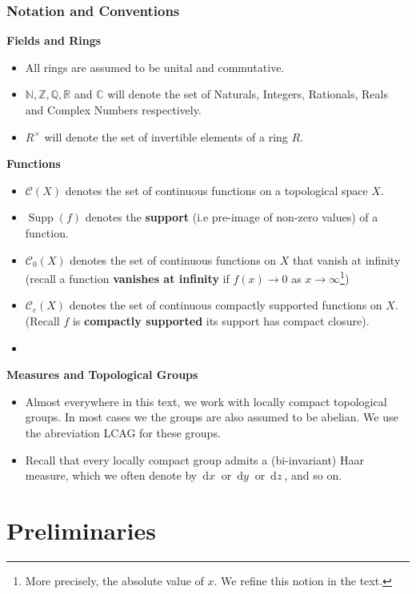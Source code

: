 \documentclass[11pt, x11names]{book}
\newcommand{\nn}{\mathbb{N}}
\newcommand{\zz}{\mathbb{Z}}
\newcommand{\qq}{\mathbb{Q}}
\newcommand{\rr}{\mathbb{R}}
\newcommand{\cc}{\mathbb{C}}
\newcommand{\fanc}{\mathscr{C}}
\DeclareMathOperator{\supp}{Supp}
\newcommand{\dx}{\, \mathrm{d}x \ }
\newcommand{\dy}{\, \mathrm{d}y \ }
\newcommand{\dz}{\, \mathrm{d}z \ }
\begin{document}
\newpage
\subsection*{Notation and Conventions}

\textbf{Fields and Rings}
\begin{itemize}
    \item All rings are assumed to be unital and commutative.
    \item $\nn, \zz, \qq, \rr$ and $\cc$ will denote the set of Naturals, Integers, Rationals, Reals and Complex Numbers respectively.
    \item $R^\times$ will denote the set of invertible elements of a ring $R$.
\end{itemize}

\textbf{Functions}
\begin{itemize}
    \item $\fanc(X)$ denotes the set of continuous functions on a topological space $X$.
    \item $\supp(f)$ denotes the \textbf{support} (i.e pre-image of non-zero values) of a function.
    \item $\fanc_0(X)$ denotes the set of continuous functions on $X$ that vanish at infinity (recall a function \textbf{vanishes at infinity} if $f(x) \to 0$ as $x \to \infty$\footnote{More precisely, the absolute value of $x$. We refine this notion in the text.})
    \item $\fanc_c(X)$ denotes the set of continuous compactly supported functions on $X$. (Recall $f$ is \textbf{compactly supported} its support has compact closure).
    \item 
\end{itemize}

\textbf{Measures and Topological Groups}
\begin{itemize}
    \item Almost everywhere in this text, we work with locally compact topological groups. In most cases we the groups are also assumed to be abelian. We use the abreviation LCAG for these groups.
    \item Recall that every locally compact group admits a (bi-invariant) Haar measure, which we often denote by $\dx$ or $\dy$ or $\dz$, and so on.
\end{itemize}



\chapter{Preliminaries}
\label{chapter: Preliminaries}
\end{document}
